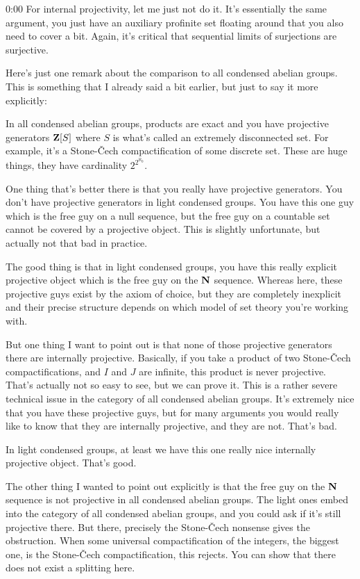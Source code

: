 \begin{unfinished}{0:00}
For internal projectivity, let me just not do it. It's essentially the same argument, you just have an auxiliary profinite set floating around that you also need to cover a bit. Again, it's critical that sequential limits of surjections are surjective.

Here's just one remark about the comparison to all condensed abelian groups. This is something that I already said a bit earlier, but just to say it more explicitly:

In all condensed abelian groups, products are exact and you have projective generators $\mathbf Z[S]$ where $S$ is what's called an extremely disconnected set. For example, it's a Stone-Čech compactification of some discrete set. These are huge things, they have cardinality $2^{2^{\aleph_0}}$.

One thing that's better there is that you really have projective generators. You don't have projective generators in light condensed groups. You have this one guy which is the free guy on a null sequence, but the free guy on a countable set cannot be covered by a projective object. This is slightly unfortunate, but actually not that bad in practice.

The good thing is that in light condensed groups, you have this really explicit projective object which is the free guy on the $\mathbf N$ sequence. Whereas here, these projective guys exist by the axiom of choice, but they are completely inexplicit and their precise structure depends on which model of set theory you're working with.

But one thing I want to point out is that none of those projective generators there are internally projective. Basically, if you take a product of two Stone-Čech compactifications, and $I$ and $J$ are infinite, this product is never projective. That's actually not so easy to see, but we can prove it. This is a rather severe technical issue in the category of all condensed abelian groups. It's extremely nice that you have these projective guys, but for many arguments you would really like to know that they are internally projective, and they are not. That's bad.

In light condensed groups, at least we have this one really nice internally projective object. That's good.

The other thing I wanted to point out explicitly is that the free guy on the $\mathbf N$ sequence is not projective in all condensed abelian groups. The light ones embed into the category of all condensed abelian groups, and you could ask if it's still projective there. But there, precisely the Stone-Čech nonsense gives the obstruction. When some universal compactification of the integers, the biggest one, is the Stone-Čech compactification, this rejects. You can show that there does not exist a splitting here.


\end{unfinished}
